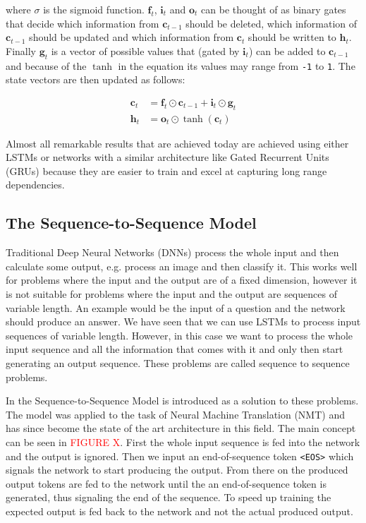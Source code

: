 \noindent where \(\sigma\) is the sigmoid function. \(\mathbf{f}_t\), \(\mathbf{i}_t\) and \(\mathbf{o}_t\) can be thought of as binary gates that decide which information from \(\mathbf{c}_{t-1}\) should be deleted, which information of \(\mathbf{c}_{t-1}\) should be updated and which information from \(\mathbf{c}_t\) should be written to \(\mathbf{h}_t\).  Finally \(\mathbf{g}_t\) is a vector of possible values that (gated by \(\mathbf{i}_t\)) can be added to \(\mathbf{c}_{t-1}\) and because of the \(\tanh\) in the equation its values may range from \texttt{-1} to \texttt{1}. The state vectors are then updated as follows:

\begin{align*}
  \mathbf{c}_t &= \mathbf{f}_t \odot \mathbf{c}_{t-1} + \mathbf{i}_t \odot \mathbf{g}_t \\
  \mathbf{h}_t &= \mathbf{o}_t \odot \tanh(\mathbf{c}_t)
\end{align*}

Almost all remarkable results that are achieved today are achieved using either LSTMs or networks with a similar architecture like Gated Recurrent Units (GRUs) \cite{gru} because they are easier to train and excel at capturing long range dependencies.

\subsection{The Sequence-to-Sequence Model}

Traditional Deep Neural Networks (DNNs) process the whole input and then calculate some output, e.g. process an image and then classify it. This works well for problems where the input and the output are of a fixed dimension, however it is not suitable for problems where the input and the output are sequences of variable length. An example would be the input of a question and the network should produce an answer. We have seen that we can use LSTMs to process input sequences of variable length. However, in this case we want to process the whole input sequence and all the information that comes with it and only then start generating an output sequence. These problems are called sequence to sequence problems.

In \cite{seq2seq} the Sequence-to-Sequence Model is introduced as a solution to these problems. The model was applied to the task of Neural Machine Translation (NMT) and has since become the state of the art architecture in this field. The main concept can be seen in \textcolor{red}{FIGURE X}. First the whole input sequence is fed into the network and the output is ignored. Then we input an end-of-sequence token \texttt{<EOS>} which signals the network to start producing the output. From there on the produced output tokens are fed to the network until the an end-of-sequence token is generated, thus signaling the end of the sequence. To speed up training the expected output is fed back to the network and not the actual produced output.

